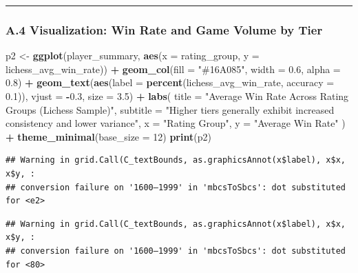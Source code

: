 \documentclass[
]{article}
\newenvironment{Shaded}{\begin{snugshade}}{\end{snugshade}}
\newcommand{\AttributeTok}[1]{\textcolor[rgb]{0.13,0.29,0.53}{#1}}
\newcommand{\DecValTok}[1]{\textcolor[rgb]{0.00,0.00,0.81}{#1}}
\newcommand{\FloatTok}[1]{\textcolor[rgb]{0.00,0.00,0.81}{#1}}
\newcommand{\FunctionTok}[1]{\textcolor[rgb]{0.13,0.29,0.53}{\textbf{#1}}}
\newcommand{\NormalTok}[1]{#1}
\newcommand{\OtherTok}[1]{\textcolor[rgb]{0.56,0.35,0.01}{#1}}
\newcommand{\SpecialCharTok}[1]{\textcolor[rgb]{0.81,0.36,0.00}{\textbf{#1}}}
\newcommand{\StringTok}[1]{\textcolor[rgb]{0.31,0.60,0.02}{#1}}
\begin{document}
\begin{center}\rule{0.5\linewidth}{0.5pt}\end{center}

\subsubsection{A.4 Visualization: Win Rate and Game Volume by
Tier}\label{a.4-visualization-win-rate-and-game-volume-by-tier}

\begin{Shaded}
\begin{Highlighting}[]
\NormalTok{p2 }\OtherTok{\textless{}{-}} \FunctionTok{ggplot}\NormalTok{(player\_summary, }\FunctionTok{aes}\NormalTok{(}\AttributeTok{x =}\NormalTok{ rating\_group, }\AttributeTok{y =}\NormalTok{ lichess\_avg\_win\_rate)) }\SpecialCharTok{+}
  \FunctionTok{geom\_col}\NormalTok{(}\AttributeTok{fill =} \StringTok{"\#16A085"}\NormalTok{, }\AttributeTok{width =} \FloatTok{0.6}\NormalTok{, }\AttributeTok{alpha =} \FloatTok{0.8}\NormalTok{) }\SpecialCharTok{+}
  \FunctionTok{geom\_text}\NormalTok{(}\FunctionTok{aes}\NormalTok{(}\AttributeTok{label =} \FunctionTok{percent}\NormalTok{(lichess\_avg\_win\_rate, }\AttributeTok{accuracy =} \FloatTok{0.1}\NormalTok{)), }\AttributeTok{vjust =} \SpecialCharTok{{-}}\FloatTok{0.3}\NormalTok{, }\AttributeTok{size =} \FloatTok{3.5}\NormalTok{) }\SpecialCharTok{+}
  \FunctionTok{labs}\NormalTok{(}
    \AttributeTok{title =} \StringTok{"Average Win Rate Across Rating Groups (Lichess Sample)"}\NormalTok{,}
    \AttributeTok{subtitle =} \StringTok{"Higher tiers generally exhibit increased consistency and lower variance"}\NormalTok{,}
    \AttributeTok{x =} \StringTok{"Rating Group"}\NormalTok{,}
    \AttributeTok{y =} \StringTok{"Average Win Rate"}
\NormalTok{  ) }\SpecialCharTok{+}
  \FunctionTok{theme\_minimal}\NormalTok{(}\AttributeTok{base\_size =} \DecValTok{12}\NormalTok{)}
\FunctionTok{print}\NormalTok{(p2)}
\end{Highlighting}
\end{Shaded}

\begin{verbatim}
## Warning in grid.Call(C_textBounds, as.graphicsAnnot(x$label), x$x, x$y, :
## conversion failure on '1600–1999' in 'mbcsToSbcs': dot substituted for <e2>
\end{verbatim}

\begin{verbatim}
## Warning in grid.Call(C_textBounds, as.graphicsAnnot(x$label), x$x, x$y, :
## conversion failure on '1600–1999' in 'mbcsToSbcs': dot substituted for <80>
\end{verbatim}
\end{document}
